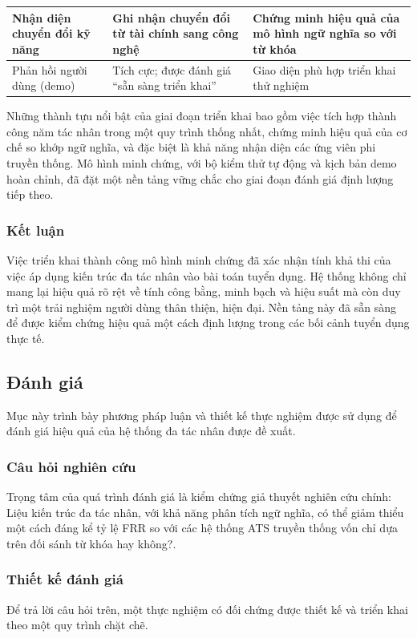 \documentclass{article}
\begin{document}
\begin{itemize}[topsep=0pt, itemsep=4pt, leftmargin=40pt]
\begin{longtable}{|
  >{\raggedright\arraybackslash}p{}|
  >{\raggedright\arraybackslash}p{}|
  >{\raggedright\arraybackslash}p{}|}
  Nhận diện chuyển đổi kỹ năng &
  Ghi nhận chuyển đổi từ tài chính sang công nghệ &
  Chứng minh hiệu quả của mô hình ngữ nghĩa so với từ khóa \\
  \hline

  Phản hồi người dùng (demo) &
  Tích cực; được đánh giá “sẵn sàng triển khai” &
  Giao diện phù hợp triển khai thử nghiệm \\

\end{longtable}

Những thành tựu nổi bật của giai đoạn triển khai bao gồm việc tích hợp thành công năm tác nhân trong một quy trình thống nhất, chứng minh hiệu quả của cơ chế so khớp ngữ nghĩa, và đặc biệt là khả năng nhận diện các ứng viên phi truyền thống. Mô hình minh chứng, với bộ kiểm thử tự động và kịch bản demo hoàn chỉnh, đã đặt một nền tảng vững chắc cho giai đoạn đánh giá định lượng tiếp theo.

\subsubsection{Kết luận}
Việc triển khai thành công mô hình minh chứng đã xác nhận tính khả thi của việc áp dụng kiến trúc đa tác nhân vào bài toán tuyển dụng. Hệ thống không chỉ mang lại hiệu quả rõ rệt về tính công bằng, minh bạch và hiệu suất mà còn duy trì một trải nghiệm người dùng thân thiện, hiện đại. Nền tảng này đã sẵn sàng để được kiểm chứng hiệu quả một cách định lượng trong các bối cảnh tuyển dụng thực tế.

\subsection{Đánh giá}
Mục này trình bày phương pháp luận và thiết kế thực nghiệm được sử dụng để đánh giá hiệu quả của hệ thống đa tác nhân được đề xuất.

\subsubsection{Câu hỏi nghiên cứu}
Trọng tâm của quá trình đánh giá là kiểm chứng giả thuyết nghiên cứu chính: Liệu kiến trúc đa tác nhân, với khả năng phân tích ngữ nghĩa, có thể giảm thiểu một cách đáng kể tỷ lệ FRR so với các hệ thống ATS truyền thống vốn chỉ dựa trên đối sánh từ khóa hay không?.

\subsubsection{Thiết kế đánh giá}
Để trả lời câu hỏi trên, một thực nghiệm có đối chứng được thiết kế và triển khai theo một quy trình chặt chẽ.


\end{itemize}
\end{document}
